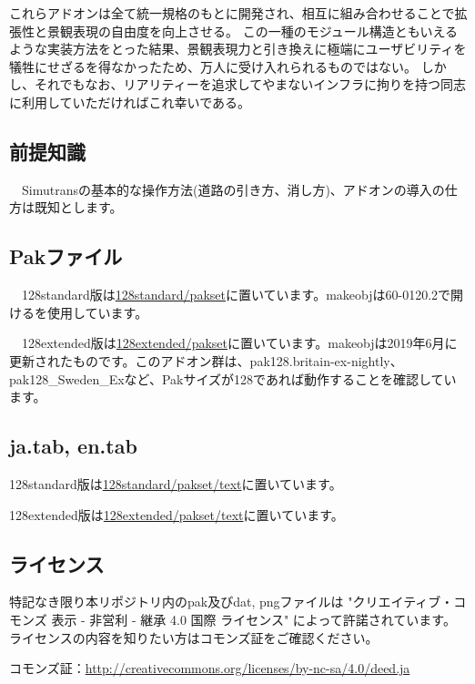 \documentclass{jarticle}
\begin{document}
これらアドオンは全て統一規格のもとに開発され、相互に組み合わせることで拡張性と景観表現の自由度を向上させる。
この一種のモジュール構造ともいえるような実装方法をとった結果、景観表現力と引き換えに極端にユーザビリティを犠牲にせざるを得なかったため、万人に受け入れられるものではない。
しかし、それでもなお、リアリティーを追求してやまないインフラに拘りを持つ同志に利用していただければこれ幸いである。

\subsection*{前提知識}
　Simutransの基本的な操作方法(道路の引き方、消し方)、アドオンの導入の仕方は既知とします。

\subsection*{Pakファイル}
　128standard版は\href{https://github.com/anoKTOK/Yokubari_roads_set_ver_anoKTOK/tree/main/128standard/pakset}{128standard/pakset}に置いています。makeobjは60-0120.2で開けるを使用しています。

　128extended版は\href{https://github.com/anoKTOK/Yokubari_roads_set_ver_anoKTOK/tree/main/128extended/pakset}{128extended/pakset}に置いています。makeobjは2019年6月に更新されたものです。このアドオン群は、pak128.britain-ex-nightly、pak128{\_}Sweden{\_}Exなど、Pakサイズが128であれば動作することを確認しています。

\subsection*{ja.tab, en.tab}
128standard版は\href{https://github.com/anoKTOK/Yokubari_roads_set_ver_anoKTOK/tree/main/128standard/pakset/text}{128standard/pakset/text}に置いています。

128extended版は\href{https://github.com/anoKTOK/Yokubari_roads_set_ver_anoKTOK/tree/main/128extended/pakset/text}{128extended/pakset/text}に置いています。


\subsection*{ライセンス}
特記なき限り本リポジトリ内のpak及びdat, pngファイルは
"クリエイティブ・コモンズ 表示 - 非営利 - 継承 4.0 国際 ライセンス"
によって許諾されています。ライセンスの内容を知りたい方はコモンズ証をご確認ください。

コモンズ証：\href{http://creativecommons.org/licenses/by-nc-sa/4.0/deed.ja}{http://creativecommons.org/licenses/by-nc-sa/4.0/deed.ja}
\end{document}
